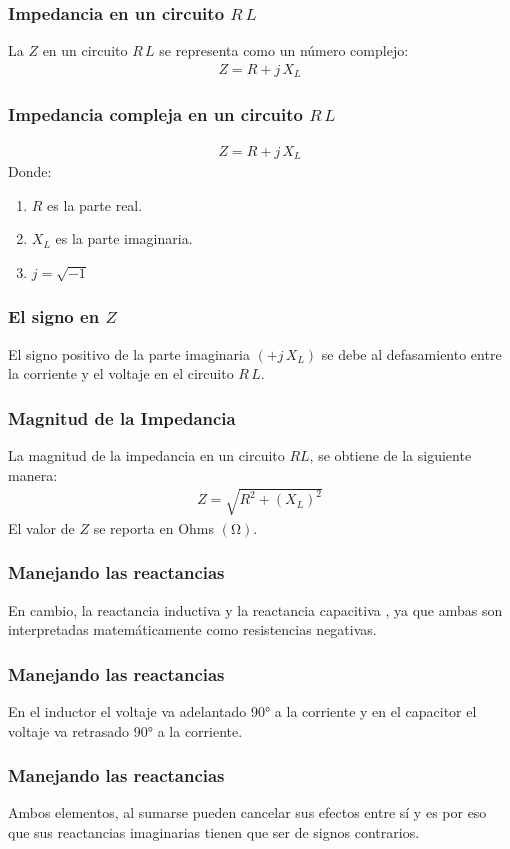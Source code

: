\documentclass[14pt]{beamer}
\begin{document}
\begin{frame}
\frametitle{Impedancia en un circuito $R \, L$}
La  $Z$ en un circuito $R \, L$ se representa como un número complejo:
\pause
\begin{align*}
Z = R + j \, X_{L}
\end{align*}
\end{frame}
\begin{frame}
\frametitle{Impedancia compleja en un circuito $R \, L$}
\vspace*{-1cm}
\begin{align*}
Z = R + j \, X_{L}
\end{align*}
Donde:
\begin{enumerate}[<+->]
\item $R$ es la parte real.
\item $X_{L}$ es la parte imaginaria.
\item $j = \sqrt{-1}$
\end{enumerate}
\end{frame}
\begin{frame}
\frametitle{El signo en $Z$}
El signo positivo de la parte imaginaria $(+ j \, X_{L})$ se debe al defasamiento entre la corriente y el voltaje en el circuito $R \, L$.
\end{frame}
\begin{frame}
\frametitle{Magnitud de la Impedancia}
La magnitud de la impedancia en un circuito $RL$, se obtiene de la siguiente manera:
\pause
\begin{align*}
Z = \sqrt{R^{2} + \left( X_{L} \right)^{2}}
\end{align*}
El valor de $Z$ se reporta en Ohms $(\si{\ohm})$.
\end{frame}

\begin{frame}
\frametitle{Manejando las reactancias}
En cambio, la reactancia inductiva y la reactancia capacitiva , \pause ya que ambas son interpretadas matemáticamente como resistencias negativas.
\end{frame}
\begin{frame}
\frametitle{Manejando las reactancias}
En el inductor el voltaje va adelantado \ang{90} a la corriente \pause y en el capacitor el voltaje va retrasado \ang{90} a la corriente.
\end{frame}
\begin{frame}
\frametitle{Manejando las reactancias}
Ambos elementos, al sumarse pueden cancelar sus efectos entre sí y es por eso que sus reactancias imaginarias tienen que ser de signos contrarios.
\end{frame}
\end{document}
